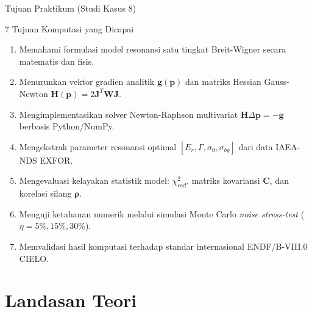 \documentclass[aspectratio=169, 10pt]{beamer}
\begin{document}
\begin{frame}{Tujuan Praktikum (Studi Kasus 8)}
	\begin{block}{7 Tujuan Komputasi yang Dicapai}
		\footnotesize
		\begin{enumerate}
			\item Memahami formulasi model resonansi satu tingkat Breit-Wigner secara matematis dan fisis.
			\item Menurunkan vektor gradien analitik $\mathbf{g}(\mathbf{p})$ dan matriks Hessian Gauss-Newton $\mathbf{H}(\mathbf{p}) = 2\mathbf{J}^T\mathbf{W}\mathbf{J}$.
			\item Mengimplementasikan solver Newton-Raphson multivariat $\mathbf{H}\Delta\mathbf{p} = -\mathbf{g}$ berbasis Python/NumPy.
			\item Mengekstrak parameter resonansi optimal $[E_r, \Gamma, \sigma_0, \sigma_{bg}]$ dari data IAEA-NDS EXFOR.
			\item Mengevaluasi kelayakan statistik model: $\chi^2_{red}$, matriks kovariansi $\mathbf{C}$, dan korelasi silang $\boldsymbol{\rho}$.
			\item Menguji ketahanan numerik melalui simulasi Monte Carlo \textit{noise stress-test} ($\eta = 5\%, 15\%, 30\%$).
			\item Memvalidasi hasil komputasi terhadap standar internasional ENDF/B-VIII.0 CIELO.
		\end{enumerate}
	\end{block}
\end{frame}


\section{Landasan Teori}
\end{document}
